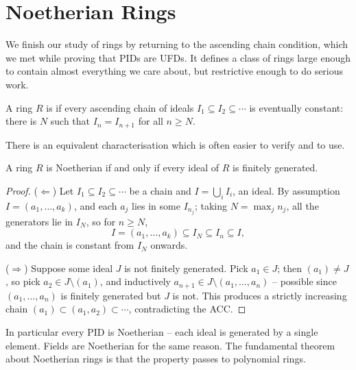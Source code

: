 \section{Noetherian Rings}

We finish our study of rings by returning to the ascending chain condition, which we met while proving that PIDs are UFDs. It defines a class of rings large enough to contain almost everything we care about, but restrictive enough to do serious work.

\begin{definition}
	A ring $R$ is  if every ascending chain of ideals $I_1 \subseteq I_2 \subseteq \cdots$ is eventually constant: there is $N$ such that $I_n = I_{n + 1}$ for all $n \geq N$.
\end{definition}

There is an equivalent characterisation which is often easier to verify and to use.

\begin{lemma}
	A ring $R$ is Noetherian if and only if every ideal of $R$ is finitely generated.
\end{lemma}
\begin{proof}
	($\Leftarrow$) Let $I_1 \subseteq I_2 \subseteq \cdots$ be a chain and $I = \bigcup_i I_i$, an ideal. By assumption $I = (a_1, \dots, a_k)$, and each $a_j$ lies in some $I_{n_j}$; taking $N = \max_j n_j$, all the generators lie in $I_N$, so for $n \geq N$,
	$$
	I = (a_1, \dots, a_k) \subseteq I_N \subseteq I_n \subseteq I,
	$$
	and the chain is constant from $I_N$ onwards.

	($\Rightarrow$) Suppose some ideal $J$ is not finitely generated. Pick $a_1 \in J$; then $(a_1) \neq J$, so pick $a_2 \in J \setminus (a_1)$, and inductively $a_{n+1} \in J \setminus (a_1, \dots, a_n)$ -- possible since $(a_1, \dots, a_n)$ is finitely generated but $J$ is not. This produces a strictly increasing chain $(a_1) \subset (a_1, a_2) \subset \cdots$, contradicting the ACC.
\end{proof}

In particular every PID is Noetherian -- each ideal is generated by a single element. Fields are Noetherian for the same reason. The fundamental theorem about Noetherian rings is that the property passes to polynomial rings.

